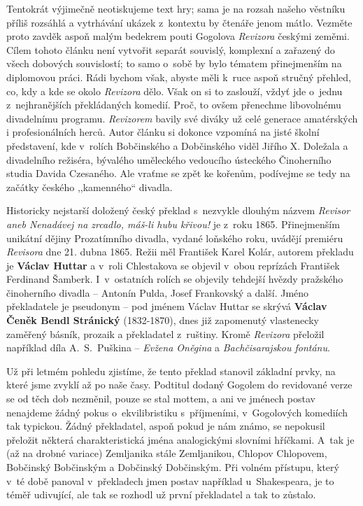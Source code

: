 Tentokrát výjimečně neotiskujeme text hry; sama je na rozsah našeho věstníku příliš rozsáhlá a vytrhávání ukázek z kontextu by čtenáře jenom mátlo. Vezměte proto zavděk aspoň malým bedekrem pouti Gogolova \textit{Revizora} českými zeměmi. Cílem tohoto článku není vytvořit separát souvislý, komplexní a zařazený do všech dobových souvislostí; to samo o~sobě by bylo tématem přinejmenším  na diplomovou práci. Rádi bychom však, abyste měli k ruce aspoň stručný přehled, co, kdy a kde se okolo \textit{Revizora} dělo. Však on si to zaslouží, vždyť jde o~jednu z nejhranějších překládaných komedií. Proč, to ovšem přenechme libovolnému divadelnímu programu. \textit{Revizorem} bavily své diváky už celé generace amatérských i profesionálních herců. Autor článku si dokonce vzpomíná na jisté školní představení, kde v rolích Bobčinského a Dobčinského viděl Jiřího X. Doležala a divadelního režiséra, bývalého uměleckého vedoucího ústeckého Činoherního studia Davida Czesaného. Ale vraťme se zpět ke kořenům, podívejme se tedy na začátky českého ,,kamenného`` divadla.

Historicky nejstarší doložený český překlad s nezvykle dlouhým názvem \textit{Revisor aneb Nenadávej na zrcadlo, máš-li hubu křivou!} je z roku 1865.  Přinejmenším unikátní dějiny Prozatímního divadla, vydané loňského roku, uvádějí premiéru \textit{Revisora} dne 21. dubna 1865. Režii měl František Karel Kolár, autorem překladu je \textbf{Václav Huttar} a v roli Chlestakova se objevil v obou reprízách František Ferdinand Šamberk. I~v ostatních rolích se objevily tehdejší hvězdy pražského činoherního divadla – Antonín Pulda, Josef Frankovský a další. Jméno překladatele je pseudonym – pod jménem Václav Huttar se skrývá \textbf{Václav Čeněk Bendl Stránický} (1832-1870), dnes již zapomenutý vlastenecky zaměřený básník, prozaik a překladatel z ruštiny. Kromě \textit{Revizora} přeložil například díla A. S. Puškina – \textit{Evžena Oněgina} a \textit{Bachčisarajskou fontánu}.

Už při letmém pohledu zjistíme, že tento překlad stanovil základní prvky, na které jsme zvyklí až po naše časy. Podtitul dodaný Gogolem do revidované verze se od těch dob nezměnil, pouze se stal mottem, a ani ve jménech postav nenajdeme žádný pokus o~ekvilibristiku s příjmeními, v Gogolových komediích tak typickou. Žádný překladatel, aspoň pokud je nám známo, se nepokusil přeložit některá charakteristická jména analogickými slovními hříčkami. A~tak je (až na drobné variace) Zemljanika stále Zemljanikou, Chlopov Chlopovem, Bobčinský Bobčinským a Dobčinský Dobčinským. Při volném přístupu, který v té době panoval v překladech jmen postav například u~Shakespeara, je to téměř udivující, ale tak se rozhodl už první překladatel a tak to zůstalo.

